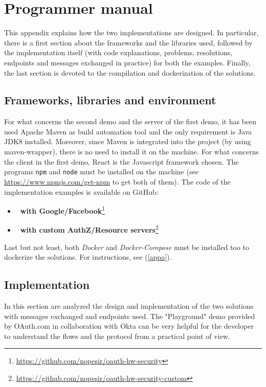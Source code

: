 
\chapter{Programmer manual}
This appendix explains how the two implementations are designed. In particular, there is a first section about the frameworks and the libraries used, followed by the implementation itself (with code explanations, problems, resolutions, endpoints and messages exchanged in practice) for both the examples. Finally, the last section is devoted to the compilation and dockerization of the solutions.

\minitoc

\section{Frameworks, libraries and environment}
For what concerns the second demo and the server of the first demo, it has been used Apache Maven as build automation tool and the only requirement is Java JDK8 installed. Moreover, since Maven is integrated into the project (by using maven-wrapper), there is no need to install it on the machine.
For what concerns the client in the first demo, React is the Javascript framework chosen. The programs \texttt{npm} and \texttt{node} must be installed on the machine (see \url{https://www.npmjs.com/get-npm} to get both of them). 
The code of the implementation examples is available on GitHub:

\begin{itemize}
    \item \textbf{\oauth\ with Google/Facebook}\footnote{\url{https://github.com/nopesir/oauth-hw-security}}
    \item \textbf{\oauth\ with custom AuthZ/Resource servers}\footnote{\url{https://github.com/nopesir/oauth-hw-security-custom}}
\end{itemize}

Last but not least, both \textit{Docker} and \textit{Docker-Compose} must be installed too to dockerize the solutions. For instructions, see (\ref{appa}).

\section{Implementation}
In this section are analyzed the design and implementation of the two solutions with messages exchanged and endpoints used. The "Playground" demo provided by OAuth.com in collaboration with Okta \cite{playgr} can be very helpful for the developer to understand the flows and the protocol from a practical point of view. 

